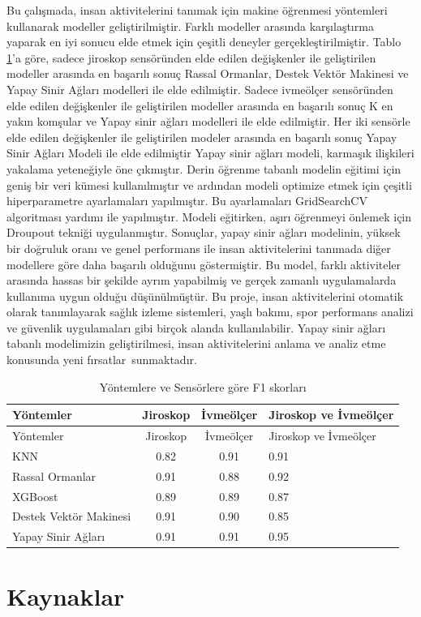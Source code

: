 \documentclass[12pt,twoside]{deuthesis}
\begin{document}
Bu çalışmada, insan aktivitelerini tanımak için makine öğrenmesi yöntemleri kullanarak modeller geliştirilmiştir. Farklı modeller arasında karşılaştırma yaparak en iyi sonucu elde etmek için çeşitli deneyler gerçekleştirilmiştir.
Tablo \ref{tab:sonuc}'a göre, sadece jiroskop sensöründen elde edilen değişkenler ile geliştirilen modeller arasında en başarılı sonuç Rassal Ormanlar, Destek Vektör Makinesi ve Yapay Sinir Ağları modelleri ile elde edilmiştir. Sadece ivmeölçer sensöründen elde edilen değişkenler ile geliştirilen modeller arasında en başarılı sonuç K en yakın komşular ve Yapay sinir ağları modelleri ile elde edilmiştir. Her iki sensörle elde edilen değişkenler ile geliştirilen modeler arasında en başarılı sonuç Yapay Sinir Ağları Modeli ile elde edilmiştir
Yapay sinir ağları modeli, karmaşık ilişkileri yakalama yeteneğiyle öne çıkmıştır. Derin öğrenme tabanlı modelin eğitimi için geniş bir veri kümesi kullanılmıştır ve ardından modeli optimize etmek için çeşitli hiperparametre ayarlamaları yapılmıştır. Bu ayarlamaları GridSearchCV algoritması yardımı ile yapılmıştır. Modeli eğitirken, aşırı öğrenmeyi önlemek için Droupout tekniği uygulanmıştır.
Sonuçlar, yapay sinir ağları modelinin, yüksek bir doğruluk oranı ve genel performans ile insan aktivitelerini tanımada diğer modellere göre daha başarılı olduğunu göstermiştir. Bu model, farklı aktiviteler arasında hassas bir şekilde ayrım yapabilmiş ve gerçek zamanlı uygulamalarda kullanıma uygun olduğu düşünülmüştür.
Bu proje, insan aktivitelerini otomatik olarak tanımlayarak sağlık izleme sistemleri, yaşlı bakımı, spor performans analizi ve güvenlik uygulamaları gibi birçok alanda kullanılabilir. Yapay sinir ağları tabanlı modelimizin geliştirilmesi, insan aktivitelerini anlama ve analiz etme konusunda yeni fırsatlar~sunmaktadır.
\begin{longtable}[]{@{}lccl@{}}
\caption{\label{tab:sonuc} Yöntemlere ve Sensörlere göre F1 skorları}\tabularnewline
\toprule()
Yöntemler & Jiroskop & İvmeölçer & Jiroskop ve İvmeölçer \\
\midrule()
\endfirsthead
\toprule()
Yöntemler & Jiroskop & İvmeölçer & Jiroskop ve İvmeölçer \\
\midrule()
\endhead
KNN & 0.82 & 0.91 & 0.91 \\
Rassal Ormanlar & 0.91 & 0.88 & 0.92 \\
XGBoost & 0.89 & 0.89 & 0.87 \\
Destek Vektör Makinesi & 0.91 & 0.90 & 0.85 \\
Yapay Sinir Ağları & 0.91 & 0.91 & 0.95 \\
\bottomrule()
\end{longtable}
\hypertarget{kaynaklar}{%
\chapter*{Kaynaklar}\label{kaynaklar}}
\end{document}
